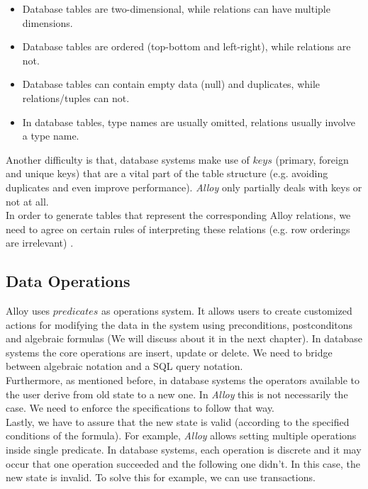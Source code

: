 \documentclass[oneside]{book}
\begin{document}
\begin{itemize}
	\item Database tables are two-dimensional, while relations can have multiple dimensions.
	\item Database tables are ordered (top-bottom and left-right), while relations are not.
	\item Database tables can contain empty data (null) and duplicates, while relations/tuples can not.
	\item In database tables, type names are usually omitted, relations usually involve a type name.
\end{itemize}

Another difficulty is that, database systems make use of $keys$  (primary, foreign and unique keys) that are a vital part of the table structure (e.g. avoiding duplicates and even improve performance). \textit{Alloy} only partially deals with keys or not at all. \\

In order to generate tables that represent the corresponding Alloy relations, we need to agree on certain rules of interpreting these relations (e.g. row orderings are irrelevant) \cite[p.~151]{introtodb}.

\subsection{Data Operations}

Alloy uses $predicates$ as operations system. It allows users to create customized actions for modifying the data in the system using preconditions, postconditons and algebraic formulas (We will discuss about it in the next chapter). In database systems the core operations are insert, update or delete. We need to bridge between algebraic notation and a SQL query notation.\\

Furthermore, as mentioned before, in database systems the operators available to the user derive from old state to a new one. In \textit{Alloy} this is not necessarily the case. We need to enforce the specifications to follow that way.\\

Lastly, we have to assure that the new state is valid (according to the specified conditions of the formula). For example, \textit{Alloy} allows setting multiple operations inside single predicate. In database systems, each operation is discrete and it may occur that one operation succeeded and the following one didn't. In this case, the new state is invalid. To solve this for example, we can use transactions.\\
\end{document}
